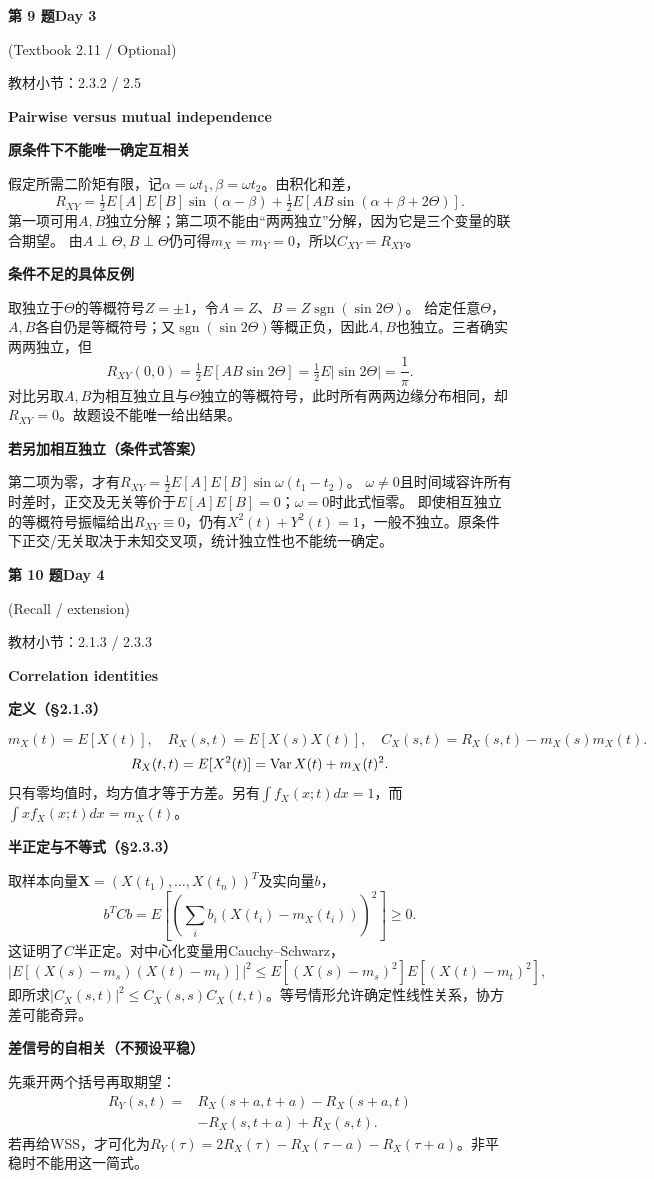 \documentclass[10.5pt,fontset=fandol]{ctexart}
\newcommand{\key}[1]{\par\vspace{4pt}\noindent\textbf{\color{navy}#1}\par\vspace{2pt}}
\newcommand{\qtitle}[2]{\par\addvspace{1.2em}\Needspace{8\baselineskip}\begin{tcolorbox}[colback=navy,colframe=navy,arc=1.5pt,boxrule=0pt]\color{white}\large\bfseries #1\hfill\small #2\end{tcolorbox}}
\begin{document}
\qtitle{第 9 题}{Day 3}
{\small\color{accentred}(Textbook 2.11 / Optional)}\par\smallskip
{\small\color{muted}教材小节：2.3.2 / 2.5}\par\medskip
\noindent\textbf{Pairwise versus mutual independence}\par\smallskip\begin{tcolorbox}[breakable,colback=qbg,colframe=qbg,boxrule=0pt]\key{原条件下不能唯一确定互相关}
假定所需二阶矩有限，记$\alpha=\omega t_1,\beta=\omega t_2$。由积化和差，
\[R_{XY}=\tfrac12E[A]E[B]\sin(\alpha-\beta)+\tfrac12E[AB\sin(\alpha+\beta+2\Theta)].\]
第一项可用$A,B$独立分解；第二项不能由“两两独立”分解，因为它是三个变量的联合期望。
由$A\perp\Theta,B\perp\Theta$仍可得$m_X=m_Y=0$，所以$C_{XY}=R_{XY}$。
\key{条件不足的具体反例}
取独立于$\Theta$的等概符号$Z=\pm1$，令$A=Z$、$B=Z\operatorname{sgn}(\sin2\Theta)$。
给定任意$\Theta$，$A,B$各自仍是等概符号；又$\operatorname{sgn}(\sin2\Theta)$等概正负，因此$A,B$也独立。三者确实两两独立，但
\[R_{XY}(0,0)=\tfrac12E[AB\sin2\Theta]=\tfrac12E|\sin2\Theta|=\frac1\pi.\]
对比另取$A,B$为相互独立且与$\Theta$独立的等概符号，此时所有两两边缘分布相同，却$R_{XY}=0$。故题设不能唯一给出结果。
\key{若另加相互独立（条件式答案）}
第二项为零，才有$R_{XY}=\tfrac12E[A]E[B]\sin\omega(t_1-t_2)$。
$\omega\ne0$且时间域容许所有时差时，正交及无关等价于$E[A]E[B]=0$；$\omega=0$时此式恒零。
即使相互独立的等概符号振幅给出$R_{XY}\equiv0$，仍有$X^2(t)+Y^2(t)=1$，一般不独立。原条件下正交/无关取决于未知交叉项，统计独立性也不能统一确定。

\end{tcolorbox}
\qtitle{第 10 题}{Day 4}
{\small\color{accentred}(Recall / extension)}\par\smallskip
{\small\color{muted}教材小节：2.1.3 / 2.3.3}\par\medskip
\noindent\textbf{Correlation identities}\par\smallskip\begin{tcolorbox}[breakable,colback=qbg,colframe=qbg,boxrule=0pt]\key{定义（§2.1.3）}
\[m_X(t)=E[X(t)],\quad R_X(s,t)=E[X(s)X(t)],\quad C_X(s,t)=R_X(s,t)-m_X(s)m_X(t).\]
\[R_X(t,t)=E[X^2(t)]=\operatorname{Var} X(t)+m_X(t)^2.\]
只有零均值时，均方值才等于方差。另有$\int f_X(x;t)dx=1$，而$\int xf_X(x;t)dx=m_X(t)$。
\key{半正定与不等式（§2.3.3）}
取样本向量$\boldsymbol X=(X(t_1),\ldots,X(t_n))^T$及实向量$b$，
\[b^TCb=E\left[\left(\sum_i b_i(X(t_i)-m_X(t_i))\right)^2\right]\ge0.\]
这证明了$C$半正定。对中心化变量用Cauchy--Schwarz，
\[|E[(X(s)-m_s)(X(t)-m_t)]|^2\le E[(X(s)-m_s)^2]E[(X(t)-m_t)^2],\]
即所求$|C_X(s,t)|^2\le C_X(s,s)C_X(t,t)$。等号情形允许确定性线性关系，协方差可能奇异。
\key{差信号的自相关（不预设平稳）}
先乘开两个括号再取期望：
\[\boxed{\begin{aligned}R_Y(s,t)={}&R_X(s+a,t+a)-R_X(s+a,t)\\&-R_X(s,t+a)+R_X(s,t).\end{aligned}}\]
若再给WSS，才可化为$R_Y(\tau)=2R_X(\tau)-R_X(\tau-a)-R_X(\tau+a)$。非平稳时不能用这一简式。

\end{tcolorbox}
\end{document}
